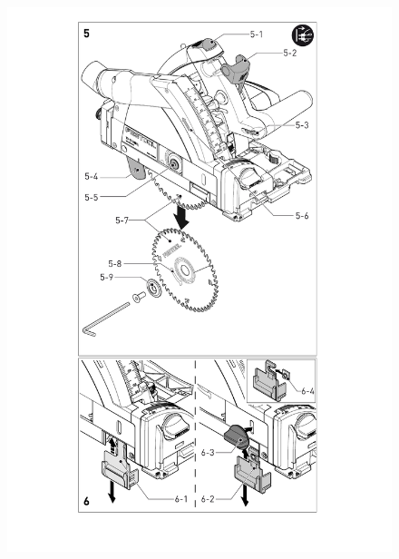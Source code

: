 \documentclass{\basedir/fablab-document}
\begin{document}
\begin{figure}[H]
	\centering
	\includegraphics[width=1\textwidth]{img/festool_bilder_2Teil1.pdf}
	\caption{}
	\label{fig:gehaeuse_oben}
\end{figure}
\end{document}
